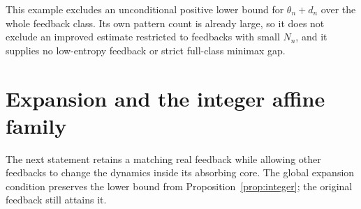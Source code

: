 \documentclass[11pt,reqno]{amsart}
\numberwithin{equation}{section}
\theoremstyle{definition}
\theoremstyle{definition}
\begin{document}
This example excludes an unconditional positive lower bound for
$\theta_n+d_n$ over the whole feedback class. Its own pattern
count is already large, so it does not exclude an improved estimate
restricted to feedbacks with small $N_n$, and it supplies no
low-entropy feedback or strict full-class minimax gap.


\section{Expansion and the integer affine family}\label{sec:extensions}
The next statement retains a matching real feedback while allowing other
feedbacks to change the dynamics inside its absorbing core. The global
expansion condition preserves the lower bound from
Proposition~\ref{prop:integer}; the original feedback still attains it.
\end{document}
